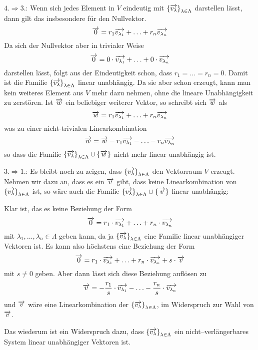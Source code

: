 {$4. \Longrightarrow 3.$: Wenn sich jedes Element in $V$ eindeutig mit $\left\{ \overrightarrow{v_{\lambda}} 
\right\}_{\lambda \in \Lambda}$ darstellen lässt, dann gilt das insbesondere für den Nullvektor. 
  	$$  \overrightarrow{0} =  r_1 \overrightarrow{v_{\lambda_1}}  + \ldots +  r_n \overrightarrow{v_{\lambda_n}} $$
Da sich der Nullvektor aber in trivialer Weise 
  	$$  \overrightarrow{0} =  0 \cdot  \overrightarrow{v_{\lambda_1}}  + \ldots +  0 \cdot \overrightarrow{v_{\lambda_n}} $$
darstellen lässt, folgt aus der Eindeutigkeit schon, dass $r_1 = \ldots = r_n = 0$. Damit ist die Familie 
$\left\{ \overrightarrow{v_{\lambda}} \right\}_{\lambda \in \Lambda}$ linear unabhängig. Da sie aber schon 
erzeugt, kann man kein weiteres Element aus $V$ mehr dazu nehmen, ohne die lineare Unabhängigkeit zu 
zerstören. Ist $\overrightarrow{w}$ ein beliebiger weiterer Vektor, so schreibt sich $\overrightarrow{w}$ als
  	$$ \overrightarrow{w} = r_1 \overrightarrow{v_{\lambda_1}} + \ldots + r_n \overrightarrow{v_{\lambda_n}} $$
was zu einer nicht-trivialen Linearkombination
  	$$ \overrightarrow{w} = \overrightarrow{w} - r_1 \overrightarrow{v_{\lambda_1}} - \ldots - r_n \overrightarrow{v_{\lambda_n}} $$
so dass die Familie $\left\{ \overrightarrow{v_{\lambda}} \right\}_{\lambda \in \Lambda} \cup 
\{\overrightarrow{w} \}$ nicht mehr linear unabhängig ist.

$3. \Longrightarrow 1.$: Es bleibt noch zu zeigen, dass $\left\{ \overrightarrow{v_{\lambda}} \right\}_{\lambda 
\in \Lambda}$ den Vektorraum $V$ erzeugt. Nehmen wir dazu an, dass es ein $\overrightarrow{v}$ gibt, dass keine  
Linearkombination von $\left\{ \overrightarrow{v_{\lambda}} \right\}_{\lambda \in \Lambda}$ ist, so wäre auch 
die Familie $\left\{ \overrightarrow{v_{\lambda}} \right\}_{\lambda \in \Lambda} \cup \{\overrightarrow{v} \}$ 
linear unabhängig:

Klar ist, das es keine Beziehung der Form
  	$$ \overrightarrow{0} =  r_1 \cdot  \overrightarrow{v_{\lambda_1}}  + \ldots +  r_n \cdot
	\overrightarrow{v_{\lambda_n}} $$
mit $\lambda_1, \ldots , \lambda_n \in \Lambda$ geben kann, da ja $\left\{ \overrightarrow{v_{\lambda}} 
\right\}_{\lambda \in \Lambda}$ eine Familie linear unabhängiger Vektoren ist. Es kann also höchstens 
eine Beziehung der Form
  	$$ \overrightarrow{0} =  r_1 \cdot  \overrightarrow{v_{\lambda_1}}  + \ldots +  r_n \cdot
	\overrightarrow{v_{\lambda_n}} + s \cdot \overrightarrow{v} $$
mit $s \neq 0$ geben. Aber dann lässt sich diese Beziehung auflösen zu 
  	$$ \overrightarrow{v} = - \frac {r_1}{s} \cdot  \overrightarrow{v_{\lambda_1}}  - \ldots -  
	\frac {r_n}{s} \cdot \overrightarrow{v_{\lambda_n}} $$
und $\overrightarrow{v}$ wäre eine Linearkombination der $\left\{ 
\overrightarrow{v_{\lambda}} \right\}_{\lambda \in \Lambda}$, im Widerspruch zur Wahl von $\overrightarrow{v}$.
 
Das wiederum ist ein Widerspruch dazu, dass $\left\{ \overrightarrow{v_{\lambda}} \right\}_{\lambda \in 
\Lambda}$ ein nicht--verlängerbares System linear unabhängiger Vektoren ist.
}

